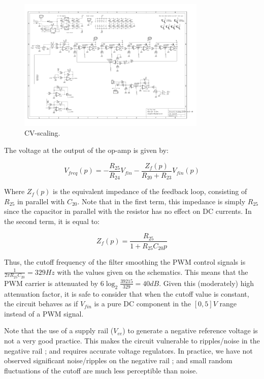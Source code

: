 \documentclass[a4paper,11pt]{article}
\begin{document}
\begin{figure}
\centering
\includegraphics[width=0.8\textwidth]{smr4mkII_scaling.pdf}
\caption{CV-scaling.}
\label{fig:cvscale}
\end{figure}

The voltage at the output of the op-amp is given by:

\begin{equation}
V_{freq}(p) = -\frac{R_{25}}{R_{24}} V_{fin} -\frac{Z_f(p)}{R_{20} + R_{23}} V_{fin}(p)
\end{equation}

Where $Z_f(p)$ is the equivalent impedance of the feedback loop, consisting of $R_{25}$ in parallel with $C_{20}$. Note that in the first term, this impedance is simply $R_{25}$ since the capacitor in parallel with the resistor has no effect on DC currents. In the second term, it is equal to:

\begin{equation}
Z_f(p) = \frac{R_{25}}{1 + R_{25}C_{20}p}
\end{equation}

Thus, the cutoff frequency of the filter smoothing the PWM control signals is $\frac{1}{2 \pi R_{25}C_{20}} = 329 Hz$ with the values given on the schematics. This means that the PWM carrier is attenuated by $6\log_2 \frac{39215}{329} = 40dB$. Given this (moderately) high attenuation factor, it is safe to consider that when the cutoff value is constant, the circuit behaves as if $V_{fin}$ is a pure DC component in the $[0, 5]V$ range instead of a PWM signal.

Note that the use of a supply rail ($V_{ee}$) to generate a negative reference voltage is not a very good practice. This makes the circuit vulnerable to ripples/noise in the negative rail ; and requires accurate voltage regulators. In practice, we have not observed significant noise/ripples on the negative rail ; and small random fluctuations of the cutoff are much less perceptible than noise.
\end{document}
